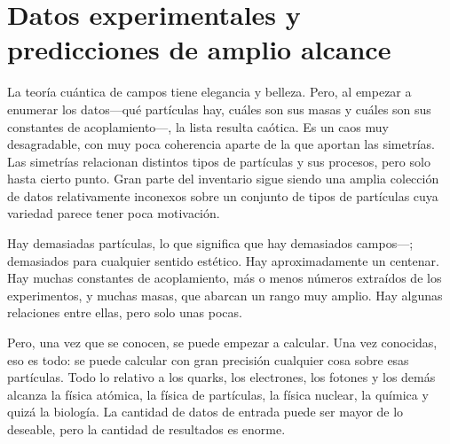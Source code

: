 \begin{classroomqa}\end{classroomqa}

\section{Datos experimentales y predicciones de amplio alcance}

La teoría cuántica de campos tiene elegancia y belleza. Pero, al empezar a enumerar los datos---qué partículas hay, cuáles son sus masas y cuáles son sus constantes de acoplamiento---, la lista resulta caótica. Es un caos muy desagradable, con muy poca coherencia aparte de la que aportan las simetrías. Las simetrías relacionan distintos tipos de partículas y sus procesos, pero solo hasta cierto punto. Gran parte del inventario sigue siendo una amplia colección de datos relativamente inconexos sobre un conjunto de tipos de partículas cuya variedad parece tener poca motivación.

\begin{classroomqa}\end{classroomqa}

Hay demasiadas partículas, lo que significa que hay demasiados campos---; demasiados para cualquier sentido estético. Hay aproximadamente un centenar. Hay muchas constantes de acoplamiento, más o menos números extraídos de los experimentos, y muchas masas, que abarcan un rango muy amplio. Hay algunas relaciones entre ellas, pero solo unas pocas.

Pero, una vez que se conocen, se puede empezar a calcular. Una vez conocidas, eso es todo: se puede calcular con gran precisión cualquier cosa sobre esas partículas. Todo lo relativo a los quarks, los electrones, los fotones y los demás alcanza la física atómica, la física de partículas, la física nuclear, la química y quizá la biología. La cantidad de datos de entrada puede ser mayor de lo deseable, pero la cantidad de resultados es enorme.

